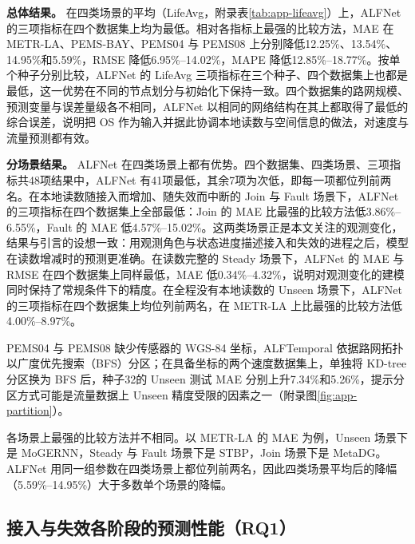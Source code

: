 \begin{table}[t]
\caption{\textbf{PEMS04 与 PEMS08（流量）上的预测性能（测试集）。}记号与表\ref{tab:main_speed}相同。速度与流量的绝对误差不可横向比较。}
\label{tab:main_flow}
\centering
\small
\setlength{\tabcolsep}{3pt}
\resizebox{\linewidth}{!}{}
\end{table}

\textbf{总体结果。} 在四类场景的平均（LifeAvg，附录表\ref{tab:app-lifeavg}）上，ALFNet 的三项指标在四个数据集上均为最低。相对各指标上最强的比较方法，MAE 在 METR-LA、PEMS-BAY、PEMS04 与 PEMS08 上分别降低12.25\%、13.54\%、14.95\%和5.59\%，RMSE 降低6.95\%–14.02\%，MAPE 降低12.85\%–18.77\%。按单个种子分别比较，ALFNet 的 LifeAvg 三项指标在三个种子、四个数据集上也都是最低，这一优势在不同的节点划分与初始化下保持一致。四个数据集的路网规模、预测变量与误差量级各不相同，ALFNet 以相同的网络结构在其上都取得了最低的综合误差，说明把 OS 作为输入并据此协调本地读数与空间信息的做法，对速度与流量预测都有效。

\textbf{分场景结果。} ALFNet 在四类场景上都有优势。四个数据集、四类场景、三项指标共48项结果中，ALFNet 有41项最低，其余7项为次低，即每一项都位列前两名。在本地读数随接入而增加、随失效而中断的 Join 与 Fault 场景下，ALFNet 的三项指标在四个数据集上全部最低：Join 的 MAE 比最强的比较方法低3.86\%–6.55\%，Fault 的 MAE 低4.57\%–15.02\%。这两类场景正是本文关注的观测变化，结果与引言的设想一致：用观测角色与状态进度描述接入和失效的进程之后，模型在读数增减时的预测更准确。在读数完整的 Steady 场景下，ALFNet 的 MAE 与 RMSE 在四个数据集上同样最低，MAE 低0.34\%–4.32\%，说明对观测变化的建模同时保持了常规条件下的精度。在全程没有本地读数的 Unseen 场景下，ALFNet 的三项指标在四个数据集上均位列前两名，在 METR-LA 上比最强的比较方法低4.00\%–8.97\%。

PEMS04 与 PEMS08 缺少传感器的 WGS-84 坐标，ALFTemporal 依据路网拓扑以广度优先搜索（BFS）分区；在具备坐标的两个速度数据集上，单独将 KD-tree 分区换为 BFS 后，种子32的 Unseen 测试 MAE 分别上升7.34\%和5.26\%，提示分区方式可能是流量数据上 Unseen 精度受限的因素之一（附录图\ref{fig:app-partition}）。

各场景上最强的比较方法并不相同。以 METR-LA 的 MAE 为例，Unseen 场景下是 MoGERNN，Steady 与 Fault 场景下是 STBP，Join 场景下是 MetaDG。ALFNet 用同一组参数在四类场景上都位列前两名，因此四类场景平均后的降幅（5.59\%–14.95\%）大于多数单个场景的降幅。

\subsection{接入与失效各阶段的预测性能（RQ1）}\label{sec:4_3}

